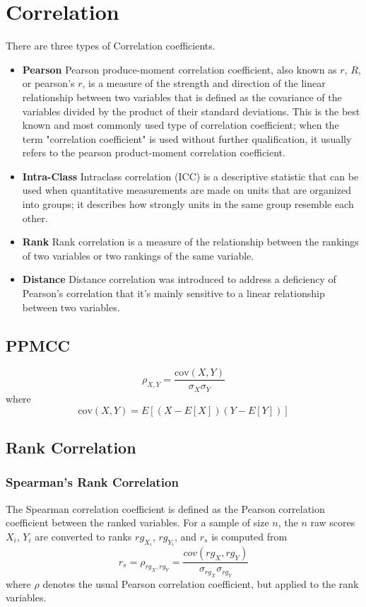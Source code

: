 \section{Correlation}

There are three types of Correlation coefficients.

\begin{itemize}
\item{\bf Pearson} Pearson produce-moment correlation coefficient, also known
as $r$, $R$, or pearson's $r$, is a measure of the strength and direction of
the linear relationship between two variables that is defined as the covariance
of the variables divided by the product of their standard deviations. This is
the best known and most commonly used type of correlation coefficient; when the
term "correlation coefficient" is used without further qualification, it
usually refers to the pearson product-moment correlation coefficient.
\item{\bf Intra-Class} Intraclass correlation (ICC) is a descriptive statistic
that can be used when quantitative measurements are made on units that are
organized into groups; it describes how strongly units in the same group
resemble each other.
\item{\bf Rank} Rank correlation is a measure of the relationship between the
rankings of two variables or two rankings of the same variable.
\item{\bf Distance} Distance correlation was introduced to address a deficiency
of Pearson's correlation that it's mainly sensitive to a linear relationship
between two variables.
\end{itemize}

\subsection{PPMCC}

$$\rho_{X,Y} = \frac{\text{cov}(X,Y)}{\sigma_X \sigma_Y} $$
where
$$ \text{cov}(X,Y) = E[(X-E[X])(Y-E[Y])] $$

\subsection{Rank Correlation}

\subsubsection{Spearman's Rank Correlation}

The Spearman correlation coefficient is defined as the Pearson correlation
coefficient between the ranked variables. For a sample of size $n$, the $n$ raw
scores $X_i$, $Y_i$ are converted to ranks $rg_{X_i}$, $rg_{Y_i}$, and $r_s$ is
computed from $$ r_s = \rho_{rg_X,rg_Y} = \frac{cov(rg_X, rg_Y)}{\sigma_{rg_X}
\sigma_{rg_Y}} $$ where $\rho$ denotes the usual Pearson correlation
coefficient, but applied to the rank variables.

